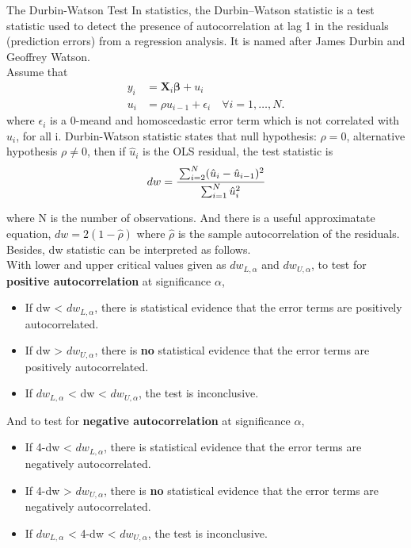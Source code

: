 \documentclass{article}
\theoremstyle{definition}
\begin{document}
\begin{itembox}[1]{The Durbin-Watson Test}
In statistics, the Durbin–Watson statistic is a test statistic used to detect the presence of autocorrelation at lag 1 in the residuals (prediction errors) from a regression analysis. It is named after James Durbin and Geoffrey Watson\cite{DW1}\cite{DW2}.\\
Assume that\\
\begin{equation*}
	\begin{split}
		y_i & = \bm{X}_i \bm{\beta} + u_i  \\
		u_i & = \rho u_{i-1} + \epsilon_i \quad \forall i = 1, \dots, N.
	\end{split}
\end{equation*}
where $\epsilon_i$ is a 0-meand and homoscedastic error term which is not correlated with $u_i$, for all i. Durbin-Watson statistic states that null hypothesis: $\rho = 0$, alternative hypothesis $\rho \neq 0$, then if $\hat{u}_i$ is the OLS residual, the test statistic is \\

\begin{equation*}
	dw = \cfrac{\sum_{i=2}^{N} (\hat{u}_i - \hat{u}_{i-1})^2}{\sum_{i=1}^{N} \hat{u}_i^2}
\end{equation*}

where N is the number of observations. And there is a useful approximatate equation, $dw = 2(1-\hat{\rho})$ where $\hat{\rho}$ is the sample autocorrelation of the residuals. Besides, dw statistic can be interpreted as follows.\\
With lower and upper critical values given as $dw_{L,\alpha}$ and $dw_{U,\alpha}$, to test for \textbf{positive autocorrelation} at significance $\alpha$, 

\begin{itemize}
	\item If dw < $dw_{L,\alpha}$, there is statistical evidence that the error terms are positively autocorrelated.
	\item If dw > $dw_{U,\alpha}$, there is \textbf{no} statistical evidence that the error terms are positively autocorrelated.
	\item If $dw_{L,\alpha}$ < dw < $dw_{U,\alpha} $, the test is inconclusive.
\end{itemize}

And to test for \textbf{negative autocorrelation} at significance $\alpha$,

\begin{itemize}
	\item If 4-dw < $dw_{L,\alpha}$, there is statistical evidence that the error terms are negatively autocorrelated.
	\item If 4-dw > $dw_{U,\alpha}$, there is \textbf{no} statistical evidence that the error terms are negatively autocorrelated.
	\item If $dw_{L,\alpha}$ < 4-dw < $dw_{U,\alpha} $, the test is inconclusive.
\end{itemize}
\end{itembox}
\end{document}
